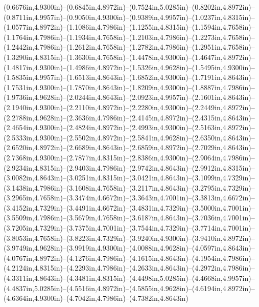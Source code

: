 (0.6676in,4.9300in)--(0.6845in,4.8972in)--(0.7524in,5.0285in)--(0.8202in,4.8972in)--(0.8711in,4.9957in)--(0.9050in,4.9300in)--(0.9389in,4.9957in)--(1.0237in,4.8315in)--(1.0577in,4.8972in)--(1.1086in,4.7986in)--(1.1255in,4.8315in)--(1.1594in,4.7658in)--(1.1764in,4.7986in)--(1.1934in,4.7658in)--(1.2103in,4.7986in)--(1.2273in,4.7658in)--(1.2442in,4.7986in)--(1.2612in,4.7658in)--(1.2782in,4.7986in)--(1.2951in,4.7658in)--(1.3290in,4.8315in)--(1.3630in,4.7658in)--(1.4478in,4.9300in)--(1.4647in,4.8972in)--(1.4817in,4.9300in)--(1.4986in,4.8972in)--(1.5326in,4.9628in)--(1.5495in,4.9300in)--(1.5835in,4.9957in)--(1.6513in,4.8643in)--(1.6852in,4.9300in)--(1.7191in,4.8643in)--(1.7531in,4.9300in)--(1.7870in,4.8643in)--(1.8209in,4.9300in)--(1.8887in,4.7986in)--(1.9736in,4.9628in)--(2.0244in,4.8643in)--(2.0923in,4.9957in)--(2.1601in,4.8643in)--(2.1940in,4.9300in)--(2.2110in,4.8972in)--(2.2280in,4.9300in)--(2.2449in,4.8972in)--(2.2788in,4.9628in)--(2.3636in,4.7986in)--(2.4145in,4.8972in)--(2.4315in,4.8643in)--(2.4654in,4.9300in)--(2.4824in,4.8972in)--(2.4993in,4.9300in)--(2.5163in,4.8972in)--(2.5333in,4.9300in)--(2.5502in,4.8972in)--(2.5841in,4.9628in)--(2.6350in,4.8643in)--(2.6520in,4.8972in)--(2.6689in,4.8643in)--(2.6859in,4.8972in)--(2.7029in,4.8643in)--(2.7368in,4.9300in)--(2.7877in,4.8315in)--(2.8386in,4.9300in)--(2.9064in,4.7986in)--(2.9234in,4.8315in)--(2.9403in,4.7986in)--(2.9742in,4.8643in)--(2.9912in,4.8315in)--(3.0082in,4.8643in)--(3.0251in,4.8315in)--(3.0421in,4.8643in)--(3.1099in,4.7329in)--(3.1438in,4.7986in)--(3.1608in,4.7658in)--(3.2117in,4.8643in)--(3.2795in,4.7329in)--(3.2965in,4.7658in)--(3.3474in,4.6672in)--(3.3643in,4.7001in)--(3.3813in,4.6672in)--(3.4152in,4.7329in)--(3.4491in,4.6672in)--(3.4831in,4.7329in)--(3.5000in,4.7001in)--(3.5509in,4.7986in)--(3.5679in,4.7658in)--(3.6187in,4.8643in)--(3.7036in,4.7001in)--(3.7205in,4.7329in)--(3.7375in,4.7001in)--(3.7544in,4.7329in)--(3.7714in,4.7001in)--(3.8053in,4.7658in)--(3.8223in,4.7329in)--(3.9240in,4.9300in)--(3.9410in,4.8972in)--(3.9749in,4.9628in)--(3.9919in,4.9300in)--(4.0088in,4.9628in)--(4.0597in,4.8643in)--(4.0767in,4.8972in)--(4.1276in,4.7986in)--(4.1615in,4.8643in)--(4.1954in,4.7986in)--(4.2124in,4.8315in)--(4.2293in,4.7986in)--(4.2633in,4.8643in)--(4.2972in,4.7986in)--(4.3311in,4.8643in)--(4.3481in,4.8315in)--(4.4498in,5.0285in)--(4.4668in,4.9957in)--(4.4837in,5.0285in)--(4.5516in,4.8972in)--(4.5855in,4.9628in)--(4.6194in,4.8972in)--(4.6364in,4.9300in)--(4.7042in,4.7986in)--(4.7382in,4.8643in) 